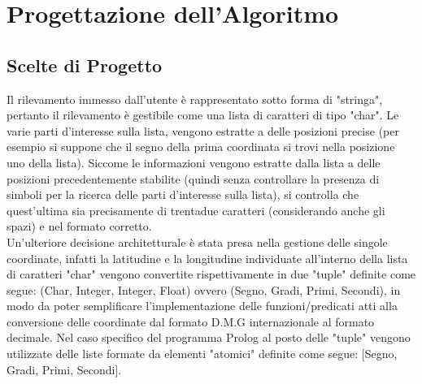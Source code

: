 \documentclass{article}
\begin{document}
\section{Progettazione dell'Algoritmo}
\subsection{Scelte di Progetto}
Il rilevamento immesso dall'utente è rappresentato sotto forma di "stringa", pertanto il rilevamento è gestibile come una lista di caratteri di tipo "char". Le varie parti d'interesse sulla lista, vengono estratte a delle posizioni precise (per esempio si suppone che il segno della prima coordinata si trovi nella posizione uno della lista).  Siccome le informazioni vengono estratte dalla lista a delle posizioni precedentemente stabilite (quindi senza controllare la presenza di simboli per la ricerca delle parti d'interesse sulla lista), si controlla che quest'ultima sia precisamente di trentadue caratteri (considerando anche gli spazi) e nel formato corretto.\\
Un'ulteriore decisione architetturale è stata presa nella gestione delle singole coordinate, infatti la latitudine e la longitudine individuate all'interno della lista di caratteri "char" vengono convertite rispettivamente in due "tuple" definite come segue: (Char, Integer, Integer, Float) ovvero (Segno, Gradi, Primi, Secondi), in modo da poter semplificare l'implementazione delle funzioni/predicati atti alla conversione delle coordinate dal formato D.M.G internazionale al formato decimale. Nel caso specifico del programma Prolog al posto delle "tuple" vengono utilizzate delle liste formate da elementi "atomici" definite come segue:  [Segno, Gradi, Primi, Secondi].
 
\end{document}
